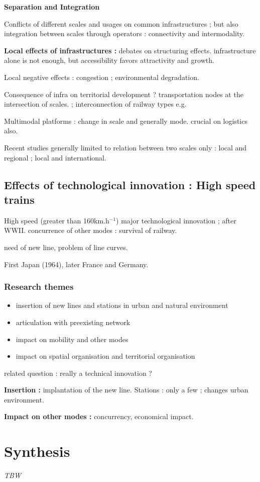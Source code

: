 \textbf{Separation and Integration}

Conflicts of different scales and usages on common infrastructures ; but also integration between scales through operators : connectivity and intermodality.

\textbf{Local effects of infrastructures : } debates on structuring effects. infrastructure alone is not enough, but accessibility favors attractivity and growth.

Local negative effects : congestion ; environmental degradation.

Consequence of infra on territorial development ? transportation nodes at the intersection of scales. ; interconnection of railway types e.g.

Multimodal platforms : change in scale and generally mode. crucial on logistics also.

Recent studies generally limited to relation between two scales only : local and regional ; local and international.


\subsection{Effects of technological innovation : High speed trains}

High speed (greater than 160km.h$^{-1}$) major technological innovation ; after WWII. concurrence of other modes : survival of railway.

need of new line, problem of line curves.

First Japan (1964), later France and Germany.


\subsubsection{Research themes}

\begin{itemize}
\item insertion of new lines and stations in urban and natural environment
\item articulation with preexisting network
\item impact on mobility and other modes
\item impact on spatial organisation and territorial organisation
\end{itemize}

related question : really a technical innovation ? 

\textbf{Insertion : } implantation of the new line. Stations : only a few ; changes urban environment.

\textbf{Impact on other modes : } concurrency, economical impact.





\section{Synthesis}

\textit{TBW}











